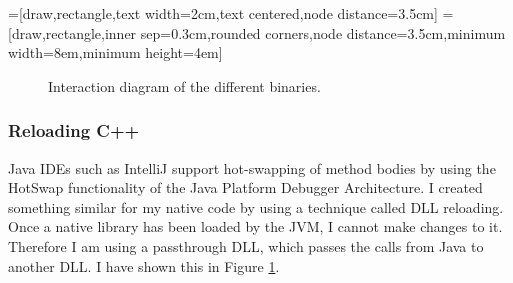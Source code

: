 \documentclass[]{article}
\begin{document}
=[draw,rectangle,text width=2cm,text centered,node distance=3.5cm]
=[draw,rectangle,inner sep=0.3cm,rounded corners,node distance=3.5cm,minimum width=8em,minimum height=4em]
\begin{figure}
  \centering
  \caption[Binary interaction]{Interaction diagram of the different binaries.}
  \label{fig:modules}
\end{figure}

\subsubsection{Reloading C++}
Java IDEs such as IntelliJ support hot-swapping of method bodies by using the HotSwap functionality of the Java Platform Debugger Architecture.
I created something similar for my native code by using a technique called DLL reloading.
Once a native library has been loaded by the JVM, I cannot make changes to it.
Therefore I am using a passthrough DLL, which passes the calls from Java to another DLL.
I have shown this in Figure \ref{fig:modules}.
\end{document}
